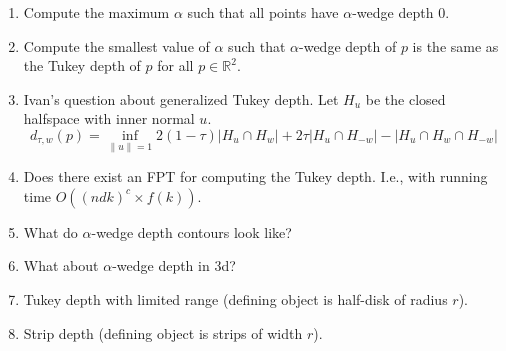 \documentclass[12pt]{article}
\begin{document}
\begin{enumerate}
\item Compute the maximum $\alpha$ such that all points have
$\alpha$-wedge depth 0.

\item Compute the smallest value of $\alpha$ such that $\alpha$-wedge
depth of $p$ is the same as the Tukey depth of $p$ for all $p\in\mathbb{R}^2$.

\item Ivan's question about generalized Tukey depth.  Let $H_u$ be the
closed halfspace with inner normal $u$.
\[
    d_{\tau,w}(p) = \inf_{\|u\|=1}
          2(1-\tau)|H_u\cap H_w|
         + 2\tau|H_{u}\cap H_{-w}| 
         - |H_u\cap H_{w}\cap H_{-w}|
\]

\item Does there exist an FPT for computing the Tukey depth.  I.e.,
with running time $O((ndk)^c\times f(k))$.

\item What do $\alpha$-wedge depth contours look like?

\item What about $\alpha$-wedge depth in 3d?

\item Tukey depth with limited range (defining object is half-disk of
radius $r$).

\item Strip depth (defining object is strips of width $r$).


\end{enumerate}
\end{document}
